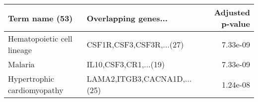 \begin{tabular}{llr}
\toprule
             Term name (53) &        Overlapping genes... &  Adjusted p-value \\
\midrule
 Hematopoietic cell lineage &    CSF1R,CSF3,CSF3R,...(27) &          7.33e-09 \\
                    Malaria &       IL10,CSF3,CR1,...(19) &          7.33e-09 \\
Hypertrophic cardiomyopathy & LAMA2,ITGB3,CACNA1D,...(25) &          1.24e-08 \\
\bottomrule
\end{tabular}
